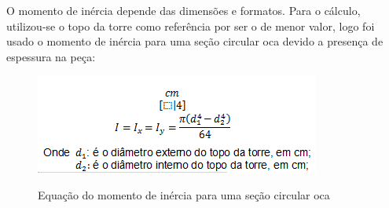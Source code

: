 O momento de inércia depende das dimensões e formatos. Para o cálculo, utilizou-se o topo da torre como referência por ser o de menor valor, logo foi usado o momento de inércia para uma seção circular oca devido a presença de espessura na peça:
 \begin{figure}[!h]
    \centering
    \includegraphics[scale = 1]{editaveis/figuras/mom_incercia}
    \label{mom_enercia}
    \caption[Equação do momento de inércia para uma seção circular oca]{Equação do momento de inércia para uma seção circular oca}
   \end{figure}
   \FloatBarrier
   
